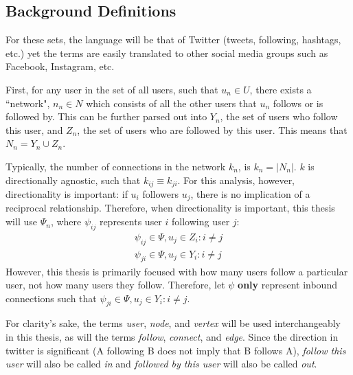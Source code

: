 \documentclass[preprint,review,12pt]{elsarticle}
\begin{document}
\subsection{Background Definitions}
For these sets, the language will be that of Twitter (tweets, following, hashtags, etc.) yet the terms are easily translated to other social media groups such as Facebook, Instagram, etc.

First, for any user in the set of all users, such that $u_n \in U$, there exists a ``network", $n_n \in N$ which consists of all the other users that $u_n$ follows or is followed by. This can be further parsed out into $Y_n$, the set of users who follow this user, and $Z_n$, the set of users who are followed by this user. This means that  $N_n = Y_n \cup Z_n$. 

Typically, the number of connections in the network $k_n$, is $k_n = |N_n|$. $k$ is directionally agnostic, such that $k_{ij} \equiv k_{ji}$. For this analysis, however, directionality is important: if $u_i$ followers $u_j$, there is no implication of a reciprocal relationship. Therefore, when directionality is important, this thesis will use $\Psi_n$, where $\psi_{ij}$ represents user $i$ following user $j$:
    \begin{equation}
    \begin{split}
    \label{Psi Equation}
        \psi_{ij} \in \Psi, u_j \in Z_i: i \neq j \\
        \psi_{ji} \in \Psi, u_j \in Y_i: i \neq j 
    \end{split}
    \end{equation}
However, this thesis is primarily focused with how many users follow a particular user, not how many users they follow. Therefore, let $\psi$ \textbf{only} represent inbound connections such that $\psi_{ji} \in \Psi, u_j \in Y_i: i \neq j$.
    

For clarity's sake, the terms \textit{user}, \textit{node}, and \textit{vertex} will be used interchangeably in this thesis, as will the terms \textit{follow}, \textit{connect}, and \textit{edge}. Since the direction in twitter is significant (A following B does not imply that B follows A), \textit{follow this user} will also be called \textit{in} and \textit{followed by this user} will also be called \textit{out}.
\end{document}
